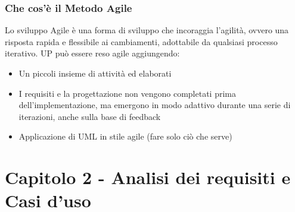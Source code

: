 \documentclass[12pt, a4paper, openany]{book}
\begin{document}
\subsection*{Che cos'è il Metodo Agile}
Lo sviluppo Agile è una forma di sviluppo che incoraggia l'agilità, ovvero una risposta
rapida e flessibile ai cambiamenti, adottabile da qualsiasi processo iterativo. UP
può essere reso agile aggiungendo:
\begin{itemize}
    \item Un piccoli insieme di attività ed elaborati
    \item I requisiti e la progettazione non vengono completati prima dell'implementazione, ma
    emergono in modo adattivo durante una serie di iterazioni, anche sulla base di feedback
    \item Applicazione di UML in stile agile (fare solo ciò che serve)
\end{itemize}

\chapter{Capitolo 2 - Analisi dei requisiti e Casi d'uso}
\end{document}
